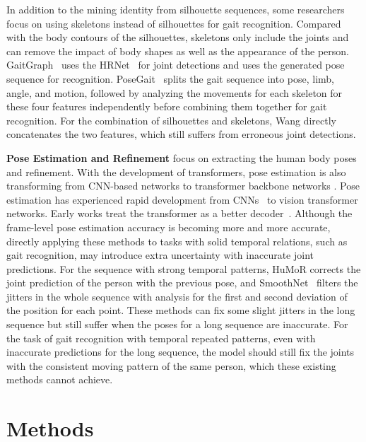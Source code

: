 \documentclass[10pt,twocolumn,letterpaper]{article}
\begin{document}
In addition to the mining identity from silhouette sequences, some researchers \cite{liao2020model,teepe2021gaitgraph} focus on using skeletons instead of silhouettes for gait recognition. Compared with the body contours of the silhouettes, skeletons only include the joints and can remove the impact of body shapes as well as the appearance of the person. GaitGraph~\cite{teepe2021gaitgraph} uses the HRNet~\cite{wang2020deep} for joint detections and uses the generated pose sequence for recognition. PoseGait~\cite{liao2020model} splits the gait sequence into pose, limb, angle, and motion, followed by analyzing the movements for each skeleton for these four features independently before combining them together for gait recognition. For the combination of silhouettes and skeletons, Wang \etal \cite{wang2022two} directly concatenates the two features, which still suffers from erroneous joint detections.


\textbf{Pose Estimation and Refinement} focus on extracting the human body poses and refinement. With the development of transformers, pose estimation is also transforming from CNN-based networks \cite{xiao2018simple,cao2019openpose,zhu2022temporal} to transformer backbone networks \cite{Li_2021_CVPR,li2021tokenpose,yang2021transpose,xu2022vitpose}.
Pose estimation has experienced rapid development from CNNs~\cite{xiao2018simple} to vision transformer networks. Early works treat the transformer as a better decoder~\cite{Li_2021_CVPR,li2021tokenpose,yang2021transpose,YuanFHLZCW21}. Although the frame-level pose estimation accuracy is becoming more and more accurate, directly applying these methods to tasks with solid temporal relations, such as gait recognition, may introduce extra uncertainty with inaccurate joint predictions. For the sequence with strong temporal patterns, HuMoR \cite{rempe2021humor} corrects the joint prediction of the person with the previous pose, and SmoothNet~\cite{zeng2021smoothnet} filters the jitters in the whole sequence with analysis for the first and second deviation of the position for each point. These methods can fix some slight jitters in the long sequence but still suffer when the poses for a long sequence are inaccurate. For the task of gait recognition with temporal repeated patterns, even with inaccurate predictions for the long sequence, the model should still fix the joints with the consistent moving pattern of the same person, which these existing methods cannot achieve.

 \section{Methods}
\end{document}
